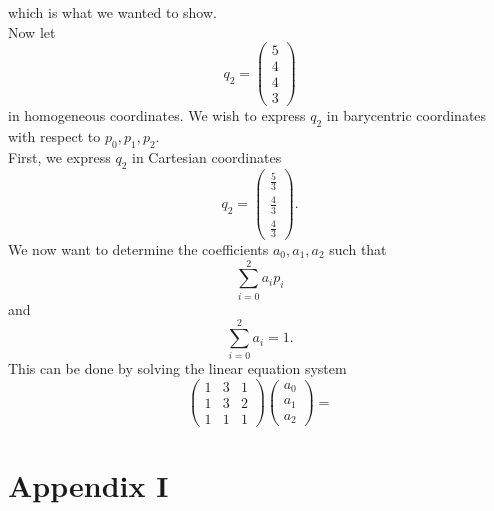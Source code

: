 \documentclass[]{article}
\begin{document}
which is what we wanted to show.\\
Now let \begin{equation*}
q_2 = \left(\begin{array}{c}
5\\
4\\
4\\
3
\end{array}\right)
\end{equation*}
in homogeneous coordinates. We wish to express $q_2$ in barycentric coordinates with respect to $p_0, p_1, p_2$.\\
First, we express $q_2$ in Cartesian coordinates \begin{equation*}
q_2 = \left(\begin{array}{c}
\frac{5}{3}\\
\frac{4}{3}\\
\frac{4}{3}
\end{array}\right).
\end{equation*}
We now want to determine the coefficients $a_0, a_1, a_2$ such that \begin{equation*}
\sum_{i=0}^{2}a_ip_i
\end{equation*}
and \begin{equation*}
\sum_{i=0}^{2}a_i=1.
\end{equation*}
This can be done by solving the linear equation system \begin{equation*}
\left(\begin{array}{ccc}
1 & 3 & 1\\
1 & 3 & 2\\
1 & 1 & 1
\end{array}\right)\left(\begin{array}{c}
a_0\\
a_1\\
a_2
\end{array}\right) = 
\end{equation*}


\newpage
\section*{Appendix I}
%
\end{document}
